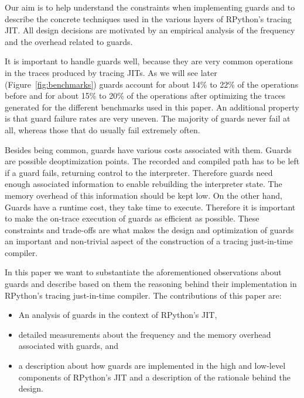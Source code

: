 \documentclass[letter,10pt]{sigplanconf}
\begin{document}
Our aim is to help understand the constraints when implementing guards
and to describe the concrete techniques used in the various layers of RPython's
tracing JIT. All design decisions are motivated by an empirical analysis of the
frequency and the overhead related to guards.

It is important to handle guards well, because they are very common operations
in the traces produced by tracing JITs. As we will see later (Figure~\ref{fig:benchmarks})
guards account for about 14\% to 22\% of the
operations before and for about 15\% to 20\% of the operations after optimizing
the traces generated for the different benchmarks used in this paper. An
additional property is that guard failure rates are very uneven. The majority
of guards never fail at all, whereas those that do usually fail extremely
often.

Besides being common, guards have various costs associated with them.
Guards are possible deoptimization points. The recorded and
compiled path has to be left if a guard fails, returning control to the
interpreter. Therefore guards need enough associated information to enable
rebuilding the interpreter state. The memory overhead of this information
should be kept low. On the other hand,
Guards have a runtime cost, they take time to execute. Therefore it is
important to make the on-trace execution of guards as efficient as possible.
These constraints and trade-offs are what makes the design
and optimization of guards an important and non-trivial aspect of the construction
of a tracing just-in-time compiler.


In this paper we want to substantiate the aforementioned observations about guards and
describe based on them the reasoning behind their implementation in
RPython's tracing just-in-time compiler. The contributions of this paper are:
\begin{itemize}
  \item An analysis of guards in the context of RPython's JIT,
  \item detailed measurements about the frequency and the
  memory overhead associated with guards, and
  \item a description about how guards are implemented in the high\-
  and low-level components of RPython's JIT and a description of the rationale behind the design.
\end{itemize}
\end{document}
